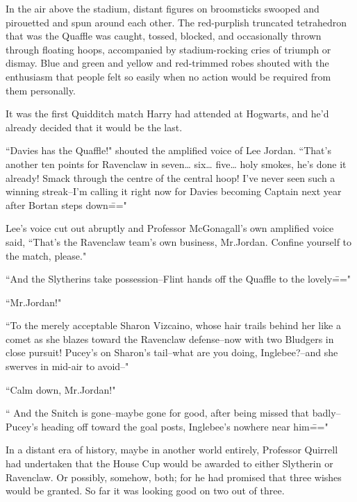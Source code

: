 \later

In the air above the stadium, distant figures on broomsticks swooped and pirouetted and spun around each other. The red-purplish truncated tetrahedron that was the Quaffle was caught, tossed, blocked, and occasionally thrown through floating hoops, accompanied by stadium-rocking cries of triumph or dismay. Blue and green and yellow and red-trimmed robes shouted with the enthusiasm that people felt so easily when no action would be required from them personally.

It was the first Quidditch match Harry had attended at Hogwarts, and he'd already decided that it would be the last.

``Davies has the Quaffle!" shouted the amplified voice of Lee Jordan. ``That's another ten points for Ravenclaw in seven{\ldots} six{\ldots} five{\ldots} holy smokes, he's done it already! Smack through the centre of the central hoop! I've never seen such a winning streak\---I'm calling it right now for Davies becoming Captain next year after Bortan steps down\==="

Lee's voice cut out abruptly and Professor McGonagall's own amplified voice said, ``That's the Ravenclaw team's own business, Mr.\?Jordan. Confine yourself to the match, please."

``And the Slytherins take possession\---Flint hands off the Quaffle to the lovely\==="

``Mr.\?Jordan!"

``To the merely acceptable Sharon Vizcaino, whose hair trails behind her like a comet as she blazes toward the Ravenclaw defense\---now with two Bludgers in close pursuit! Pucey's on Sharon's tail\---what are you doing, Inglebee?\---and she swerves in mid-air to avoid\---"

``Calm down, Mr.\?Jordan!"

`` And the Snitch is gone\---maybe gone for good, after being missed that badly\---Pucey's heading off toward the goal posts, Inglebee's nowhere near him\==="

In a distant era of history, maybe in another world entirely, Professor Quirrell had undertaken that the House Cup would be awarded to either Slytherin or Ravenclaw. Or possibly, somehow, both; for he had promised that three wishes would be granted. So far it was looking good on two out of three.

